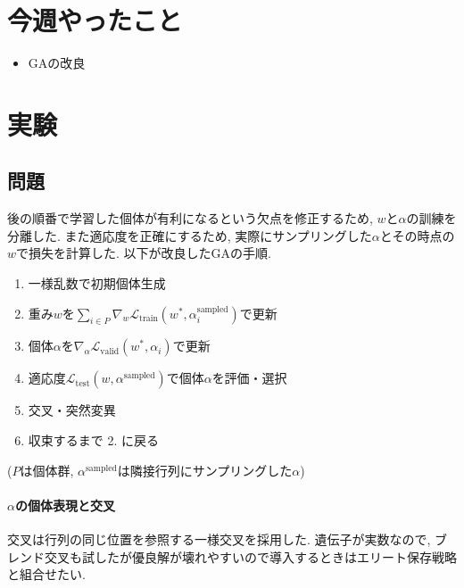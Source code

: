 \documentclass[twocolumn]{jarticle}     %
\begin{document}


\section{今週やったこと}
\begin{itemize}
  \item GAの改良
\end{itemize}

\section{実験}

\subsection{問題}

後の順番で学習した個体が有利になるという欠点を修正するため, $w$と$\alpha$の訓練を分離した.
また適応度を正確にするため, 実際にサンプリングした$\alpha$とその時点の$w$で損失を計算した.
以下が改良したGAの手順.

\begin{enumerate}
  \item 一様乱数で初期個体生成
  \item 重み$w$を$\displaystyle \sum_{i \in P} \nabla_w \mathcal{L}_{\mathrm{train}}(w^*, \alpha^\mathrm{sampled}_i)$で更新
  \item 個体$\alpha$を$\displaystyle \nabla_\alpha \mathcal{L}_{\mathrm{valid}}(w^*, \alpha_i)$で更新
  \item 適応度$\displaystyle \mathcal{L}_{\mathrm{test}}(w, \alpha^\mathrm{sampled})$で個体$\alpha$を評価・選択
  \item 交叉・突然変異
  \item 収束するまで 2. に戻る
\end{enumerate}
($P$は個体群, $\alpha^\mathrm{sampled}$は隣接行列にサンプリングした$\alpha$)

\paragraph{$\alpha$の個体表現と交叉}
交叉は行列の同じ位置を参照する一様交叉を採用した.
遺伝子が実数なので, ブレンド交叉も試したが優良解が壊れやすいので導入するときはエリート保存戦略と組合せたい.
\end{document}
